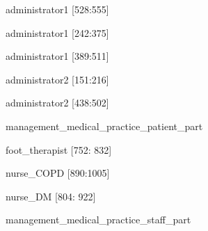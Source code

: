 \documentclass[12pt,a4paper,oneside]{article}
\begin{document}
\begin{itemize}
{ \item administrator1 [528:555] }%
{ \item administrator1 [242:375] }%
{ \item administrator1 [389:511] }%
{ \item administrator2 [151:216] }%
{ \item administrator2 [438:502] }%
\end{itemize}
{management\_medical\_practice\_patient\_part}%
\begin{itemize}
{ \item foot\_therapist [752: 832] }%
{ \item nurse\_COPD [890:1005] }%
{ \item nurse\_DM [804: 922] }%
\end{itemize}
{management\_medical\_practice\_staff\_part}%
\end{document}
